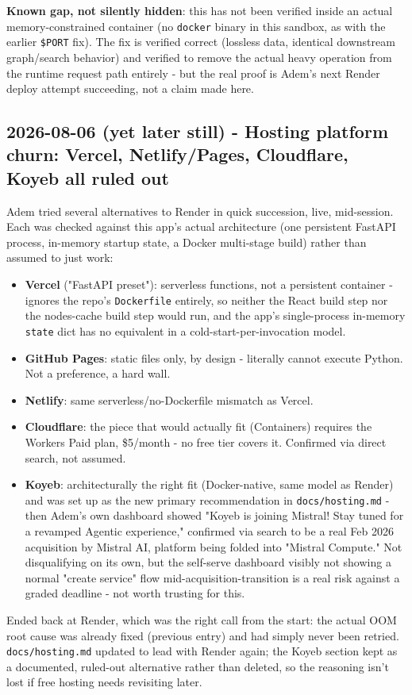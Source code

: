 \textbf{Known gap, not silently hidden}: this has not been verified inside an actual memory-constrained container (no \texttt{docker} binary in this sandbox, as with the earlier \texttt{\$PORT} fix). The fix is verified correct (lossless data, identical downstream graph/search behavior) and verified to remove the actual heavy operation from the runtime request path entirely - but the real proof is Adem's next Render deploy attempt succeeding, not a claim made here.

\subsection*{2026-08-06 (yet later still) - Hosting platform churn: Vercel, Netlify/Pages, Cloudflare, Koyeb all ruled out}
Adem tried several alternatives to Render in quick succession, live, mid-session. Each was checked against this app's actual architecture (one persistent FastAPI process, in-memory startup state, a Docker multi-stage build) rather than assumed to just work:

\begin{itemize}
\item \textbf{Vercel} ("FastAPI preset"): serverless functions, not a persistent container - ignores the repo's \texttt{Dockerfile} entirely, so neither the React build step nor the nodes-cache build step would run, and the app's single-process in-memory \texttt{state} dict has no equivalent in a cold-start-per-invocation model.
\item \textbf{GitHub Pages}: static files only, by design - literally cannot execute Python. Not a preference, a hard wall.
\item \textbf{Netlify}: same serverless/no-Dockerfile mismatch as Vercel.
\item \textbf{Cloudflare}: the piece that would actually fit (Containers) requires the Workers Paid plan, \$5/month - no free tier covers it. Confirmed via direct search, not assumed.
\item \textbf{Koyeb}: architecturally the right fit (Docker-native, same model as Render) and was set up as the new primary recommendation in \texttt{docs/\allowbreak{}hosting.md} - then Adem's own dashboard showed "Koyeb is joining Mistral! Stay tuned for a revamped Agentic experience," confirmed via search to be a real Feb 2026 acquisition by Mistral AI, platform being folded into "Mistral Compute." Not disqualifying on its own, but the self-serve dashboard visibly not showing a normal "create service" flow mid-acquisition-transition is a real risk against a graded deadline - not worth trusting for this.
\end{itemize}
Ended back at Render, which was the right call from the start: the actual OOM root cause was already fixed (previous entry) and had simply never been retried. \texttt{docs/\allowbreak{}hosting.md} updated to lead with Render again; the Koyeb section kept as a documented, ruled-out alternative rather than deleted, so the reasoning isn't lost if free hosting needs revisiting later.

